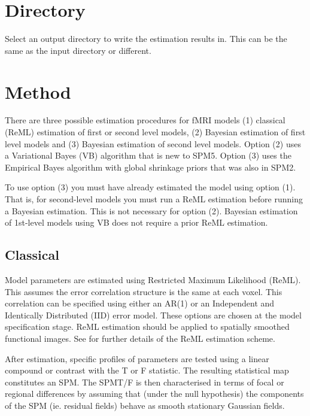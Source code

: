 \documentclass[a4paper,titlepage]{book}
\begin{document}
\section{Directory}
Select an output directory to write the estimation results in. This can be the same as the input directory  or different. 


\section{Method}
There are three possible estimation procedures for fMRI models (1) classical (ReML) estimation of first or second level models, (2) Bayesian estimation of first level models and (3) Bayesian estimation of second level models. Option (2) uses a Variational Bayes (VB) algorithm that is new to SPM5. Option (3) uses the Empirical Bayes algorithm with global shrinkage priors that was also in SPM2. 

                                                                                                            

To use option (3) you must have already estimated the model using option (1). That is, for second-level models you must run a ReML estimation before running a Bayesian estimation. This is not necessary for option (2). Bayesian estimation of 1st-level models using VB does not require a prior ReML estimation.


\subsection{Classical}
Model parameters are estimated using Restricted Maximum Likelihood (ReML). This assumes the error correlation structure is the same at each voxel. This correlation can be specified using either an AR(1) or an Independent and Identically Distributed (IID) error model. These options are chosen at the model specification stage. ReML estimation should be applied to spatially smoothed functional images. See \cite{peb1,peb2} for 
further details of the ReML estimation scheme.

                                                                        After estimation, specific profiles of parameters are tested using a linear compound or contrast with the T or F statistic. The resulting statistical map constitutes an SPM. The SPM{T}/{F} is then characterised in terms of focal or regional differences by assuming that (under the null hypothesis) the components of the SPM (ie. residual fields) behave as smooth stationary Gaussian fields.
\end{document}
